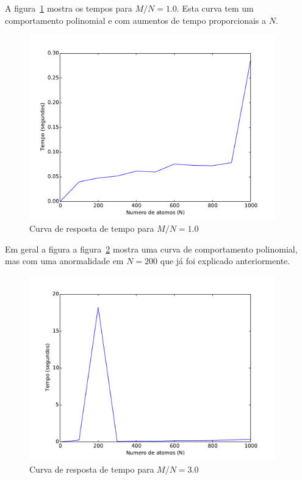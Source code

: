 		A figura~\ref{fig:max2satmn10} mostra os tempos para $M/N=1.0$. Esta curva tem um comportamento polinomial e com aumentos de tempo proporcionais a $N$.
		\begin{figure}[H]
			\centering
			\includegraphics[height=8cm]{images/max2sat_mn10}
			\caption{Curva de resposta de tempo para $M/N=1.0$}
			\label{fig:max2satmn10}
		\end{figure}
		
		Em geral a figura a figura~\ref{fig:max2satmn30} mostra uma curva de comportamento polinomial, mas com uma anormalidade em $N=200$ que já foi explicado anteriormente.
		\begin{figure}[H]
			\centering
			\includegraphics[height=8cm]{images/max2sat_mn30}
			\caption{Curva de resposta de tempo para $M/N=3.0$}
			\label{fig:max2satmn30}
		\end{figure}
		
